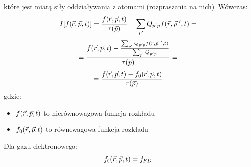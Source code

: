 \begin{enumerate}
które jest miarą siły oddziaływania z atomami (rozpraszania na nich).
Wówczas:
\begin{equation}I[f(\vec{r},\vec{p},t)]=\frac{f(\vec{r},\vec{p},t)}{\tau(\vec{p})}-\sum_{p'}Q_{p'p}f(\vec{r},\vec{p}~',t)=\end{equation}
\begin{equation}=\frac{f(\vec{r},\vec{p},t)-\frac{\sum_{p'}Q_{p'p}f(\vec{r},\vec{p}~',t)}{\sum_{p'}Q_{p'p}}}{\tau(\vec{p})}=\nonumber\end{equation}
\begin{equation}=\frac{f(\vec{r},\vec{p},t)-f_0(\vec{r},\vec{p},t)}{\tau(\vec{p})}\nonumber\end{equation}
gdzie:
\begin{itemize}
\item $f(\vec{r},\vec{p},t)$ to nierównowagowa funkcja rozkładu
\item $f_0(\vec{r},\vec{p},t)$ to równowagowa funkcja rozkładu\\
\end{itemize}
Dla gazu elektronowego:
\begin{equation}f_0(\vec{r},\vec{p},t)=f_{FD}\end{equation}


\end{enumerate}
